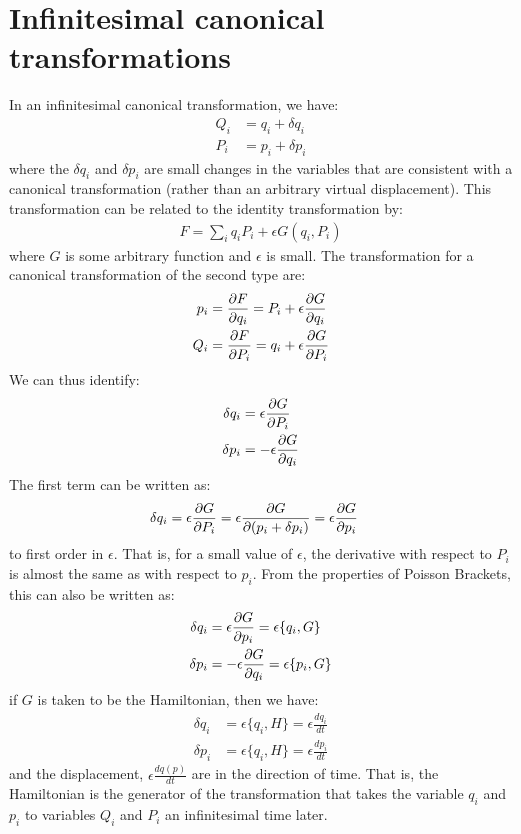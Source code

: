 \section{Infinitesimal canonical transformations}
In an infinitesimal canonical transformation, we have:
\begin{align}
Q_i&=q_i+\delta q_i\\
P_i&=p_i+\delta p_i
\end{align}
where the $\delta q_i$ and $\delta p_i$ are small changes in the variables that are consistent with a canonical transformation (rather than an arbitrary virtual displacement).
This transformation can be related to the identity transformation by:
\begin{align}
F=\sum_iq_iP_i+\epsilon G(q_i,P_i)
\end{align}
where $G$ is some arbitrary function and $\epsilon$ is small. The transformation for a canonical transformation of the second type are:
\begin{align}
p_i&=\frac{\partial F}{\partial q_i}=P_i+\epsilon\frac{\partial G}{\partial q_i}\nonumber\\
Q_i&=\frac{\partial F}{\partial P_i}=q_i+\epsilon\frac{\partial G}{\partial P_i}
\end{align}
We can thus identify:
\begin{align}
\delta q_i&=\epsilon\frac{\partial G}{\partial P_i}\nonumber\\
\delta p_i&=-\epsilon\frac{\partial G}{\partial q_i}
\end{align}
The first term can be written as:
\begin{align}
\delta q_i&=\epsilon\frac{\partial G}{\partial P_i}=\epsilon\frac{\partial G}{\partial (p_i+\delta p_i)}=\epsilon\frac{\partial G}{\partial p_i}
\end{align}
to first order in $\epsilon$. That is, for a small value of $\epsilon$, the derivative with respect to $P_i$ is almost the same as with respect to $p_i$.
From the properties of Poisson Brackets, this can also be written as:
\begin{align}
\delta q_i&=\epsilon\frac{\partial G}{\partial p_i}=\epsilon\{q_i,G\}\nonumber\\
\delta p_i&=-\epsilon\frac{\partial G}{\partial q_i}=\epsilon\{p_i,G\}
\end{align}
if $G$ is taken to be the Hamiltonian, then we have:
\begin{align}
\delta q_i&=\epsilon\{q_i,H\}=\epsilon\frac{dq_i}{dt}\nonumber\\
\delta p_i&=\epsilon\{q_i,H\}=\epsilon\frac{dp_i}{dt}
\end{align}
and the displacement, $\epsilon\frac{dq(p)}{dt}$ are in the direction of time. That is, the Hamiltonian is the generator of the transformation that takes the variable $q_i$ and $p_i$ to variables $Q_i$ and $P_i$ an infinitesimal time later. 


